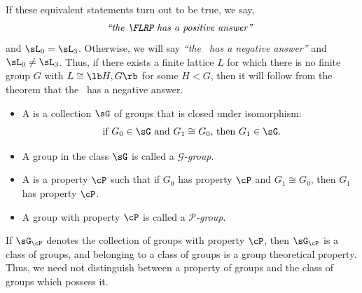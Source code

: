 \begin{frame}[fragile,label=LocalStructureNegAnswer]{}
If these equivalent statements turn out to be true, we say,
\[\text{\emph{``the \FLRP\ has a positive answer''}  }\] and $\sL_0 = \sL_3$.
Otherwise, we will say 
\emph{``the \FLRP\ has a negative answer''} 
and $\sL_0 \neq \sL_3$.
\vskip4mm Thus, if there exists a finite lattice $L$ for which 
there is no finite group $G$ with $L \cong \lb H,G \rb$ for some $H< G$,
then it will follow from the theorem that the \FLRP\ has a negative answer.
\end{frame}








\begin{frame}[label=ClassProp]{}
  \begin{itemize}
  \item  A  is a
    collection $\sG$ of groups that is closed under isomorphism:
    \[
    \text{ if $G_0\in \sG$ and  $G_1\cong G_0$, then $G_1\in \sG$.}
    \]
\vskip5pt
\item[] A group in the class $\sG$ is called a \emph{$\mathscr{G}$-group}.
  \vskip14mm
  \item A 
    is a property $\cP$ such that if $G_0$ has property $\cP$ and
    $G_1\cong G_0$, then $G_1$ has property $\cP$.
\vskip5pt
\item[] A group with property $\cP$ is called a \emph{$\mathcal{P}$-group}.  
  \end{itemize}
\end{frame}

\begin{frame}[label=ClassProp]{}
If $\sG_{\cP}$ denotes the collection of groups with property $\cP$, then
  $\sG_{\cP}$  is a class of groups, and belonging to a class of groups is a
  group theoretical property. \\[6pt]
Thus, we need not distinguish between a property of groups and the
  class of groups which possess it.
\vskip2cm
\end{frame}

